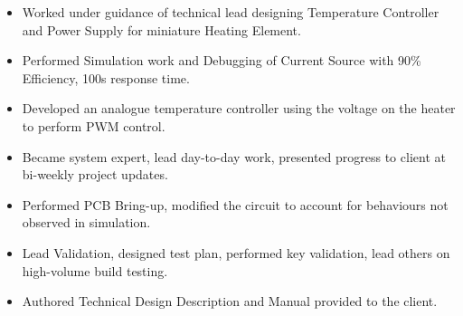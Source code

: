 
{
  {\begin{itemize}
    \item Worked under guidance of technical lead designing Temperature Controller and Power Supply for miniature Heating Element. 
    \item Performed Simulation work and Debugging of Current Source with 90\% Efficiency, 100\mu s response time. 
    \item Developed an analogue temperature controller using the voltage on the heater to perform PWM control. 
    \item Became system expert, lead day-to-day work, presented progress to client at bi-weekly project updates.
    \item Performed PCB Bring-up, modified the circuit to account for behaviours not observed in simulation. 
    \item Lead Validation, designed test plan, performed key validation, lead others on high-volume build testing. 
    \item Authored Technical Design Description and Manual provided to the client. 
  \end{itemize} 
  }
}